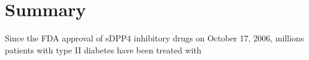 \section{\label{chap:Sum} Summary}
Since the FDA approval of sDPP4 inhibitory drugs on October 17, 2006, millions patients with type II diabetes have been treated with 

